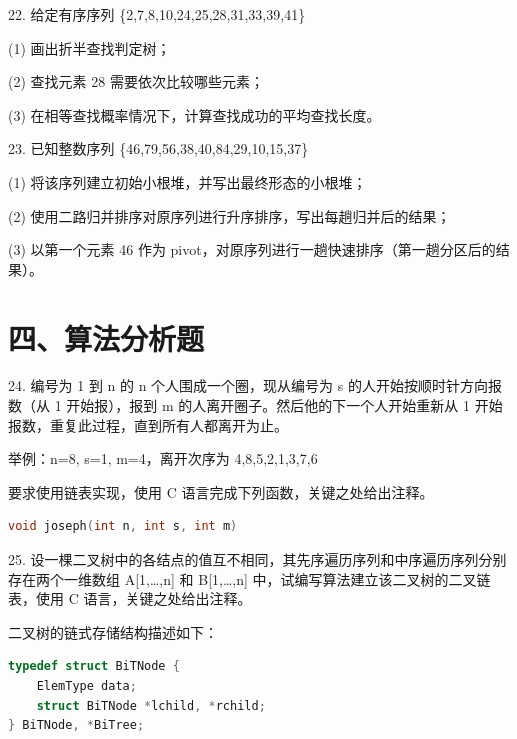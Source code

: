 \vspace{10em}

22. 给定有序序列 \{2,7,8,10,24,25,28,31,33,39,41\}

(1) 画出折半查找判定树；

(2) 查找元素 28 需要依次比较哪些元素；

(3) 在相等查找概率情况下，计算查找成功的平均查找长度。

\vspace{10em}

\newpage

23. 已知整数序列 \{46,79,56,38,40,84,29,10,15,37\}

(1) 将该序列建立初始小根堆，并写出最终形态的小根堆；

(2) 使用二路归并排序对原序列进行升序排序，写出每趟归并后的结果；

(3) 以第一个元素 46 作为 pivot，对原序列进行一趟快速排序（第一趟分区后的结果）。

\vspace{10em}

\newpage

\section*{四、算法分析题}

24. 编号为 1 到 n 的 n 个人围成一个圈，现从编号为 s 的人开始按顺时针方向报数（从 1 开始报），报到 m 的人离开圈子。然后他的下一个人开始重新从 1 开始报数，重复此过程，直到所有人都离开为止。

举例：n=8, s=1, m=4，离开次序为 4,8,5,2,1,3,7,6

要求使用链表实现，使用 C 语言完成下列函数，关键之处给出注释。

\begin{lstlisting}[language=C, basicstyle=\ttfamily]
void joseph(int n, int s, int m)
\end{lstlisting}

\vspace{15em}

\newpage

25. 设一棵二叉树中的各结点的值互不相同，其先序遍历序列和中序遍历序列分别存在两个一维数组 A[1,\dots,n] 和 B[1,\dots,n] 中，试编写算法建立该二叉树的二叉链表，使用 C 语言，关键之处给出注释。

二叉树的链式存储结构描述如下：

\begin{lstlisting}[language=C, basicstyle=\ttfamily]
typedef struct BiTNode {
    ElemType data;
    struct BiTNode *lchild, *rchild;
} BiTNode, *BiTree;
\end{lstlisting}

